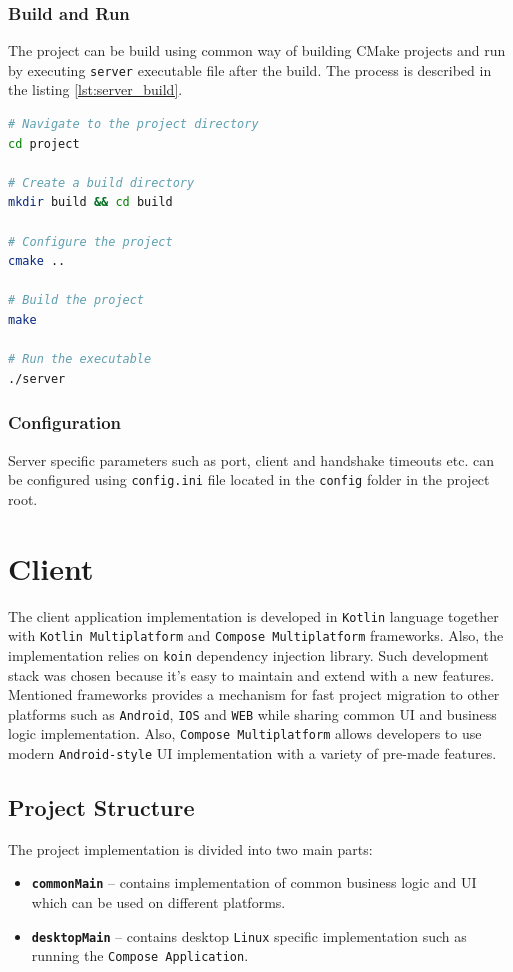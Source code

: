 \documentclass[english, sem, kiv, he, iso690alph, pdf, viewonly]{fasthesis}
\begin{document}
\subsection{Build and Run}
The project can be build using common way of building CMake projects and run by executing \texttt{server} executable file after the build. The process is described in the listing \ref{lst:server_build}.

\begin{lstlisting}[language=bash, caption={Example server build and run}, label={lst:server_build}]
# Navigate to the project directory
cd project
	
# Create a build directory
mkdir build && cd build
	
# Configure the project
cmake ..
	
# Build the project
make
	
# Run the executable
./server
\end{lstlisting}

\subsection{Configuration}
Server specific parameters such as port, client and handshake timeouts etc. can be configured using \texttt{config.ini} file located in the \texttt{config} folder in the project root.

\chapter{Client}
The client application implementation is developed in \texttt{Kotlin} language together with \texttt{Kotlin Multiplatform} and \texttt{Compose Multiplatform} frameworks. Also, the implementation relies on \texttt{koin} dependency injection library. Such development stack was chosen because it's easy to maintain and extend with a new features. Mentioned frameworks provides a mechanism for fast project migration to other platforms such as \texttt{Android}, \texttt{IOS} and \texttt{WEB} while sharing common \ac{UI} and business logic implementation. Also, \texttt{Compose Multiplatform} allows developers to use modern \texttt{Android-style} \ac{UI} implementation with a variety of pre-made features.

\section{Project Structure}
The project implementation is divided into two main parts:
\begin{itemize}
	\item \textbf{\texttt{commonMain}} -- contains implementation of common business logic and \ac{UI} which can be used on different platforms.
	\item \textbf{\texttt{desktopMain}} -- contains desktop \texttt{Linux} specific implementation such as running the \texttt{Compose Application}.    
\end{itemize}
\end{document}
